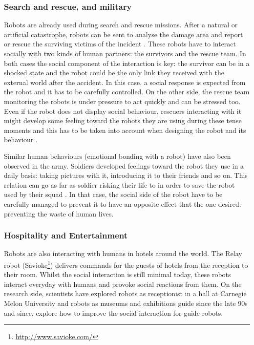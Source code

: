 \subsubsection{Search and rescue, and military} 
	
    Robots are already used during search and rescue missions. After a natural or artificial catastrophe, robots can be sent to analyse the damage area and report or rescue the surviving victims of the incident \citep{murphy2008search}. These robots have to interact socially with two kinds of human partners: the survivors and the rescue team. In both cases the social component of the interaction is key: the survivor can be in a shocked state and the robot could be the only link they received with the external world after the accident. In this case, a social response is expected from the robot and it has to be carefully controlled. On the other side, the rescue team monitoring the robots is under pressure to act quickly and can be stressed too. Even if the robot does not display social behaviour, rescuers interacting with it might develop some feeling toward the robots they are using during these tense moments and this has to be taken into account when designing the robot and its behaviour \citep{fincannon2004evidence}.
	
    Similar human behaviours (emotional bonding with a robot) have also been observed in the army. Soldiers developed feelings toward the robot they use in a daily basis: taking pictures with it, introducing it to their friends and so on. This relation can go as far as soldier risking their life to in order to save the robot used by their squad \citep{singer2009wired}. In that case, the social side of the robot have to be carefully managed to prevent it to have an opposite effect that the one desired: preventing the waste of human lives.
		
\subsubsection{Hospitality and Entertainment} 
	
	Robots are also interacting with humans in hotels around the world. The Relay robot (Savioke\footnote{\url{http://www.savioke.com/}}) delivers commands for the guests of hotels from the reception to their room. Whilst the social interaction is still minimal today, these robots interact everyday with humans and provoke social reactions from them. On the research side, scientists have explored robots as receptionist in a hall at Carnegie Melon University \citep{gockley2005designing} and robots as museums and exhibitions guide since the late 90s \citep{thrun1999minerva,burgard1999experiences} and since, explore how to improve the social interaction for guide robots.
	
